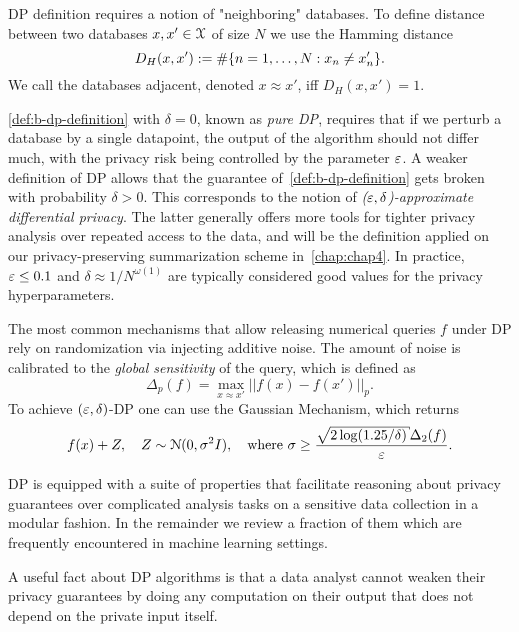 DP definition requires a notion of "neighboring" databases.
To define distance between two databases $x, x' \in \mathcal{X}$ of size $ N $ we use the Hamming distance
\[
D_{H}(x, x') := \#\{n=1,\ldots,N: x_n \neq x'_n \}.
\]
We call the databases adjacent, denoted $ x \approx x'$, iff $D_{H}(x, x')=1$.


\label{sec:b-differential-privacy}

\cref{def:b-dp-definition} with $\delta=0$, known as \emph{pure DP}, requires that if we perturb a database by a single datapoint, the output of the algorithm should not differ much, with the privacy risk being controlled by the parameter $\varepsilon$.
A weaker definition of DP allows that the guarantee of~\cref{def:b-dp-definition} gets broken with probability $\delta>0$. This corresponds to the notion of \emph{($\varepsilon, \delta$)-approximate differential privacy}. The latter generally offers more tools for tighter privacy analysis over repeated access to the data, and will be the definition applied on our privacy-preserving summarization scheme in~\cref{chap:chap4}. In practice, $\varepsilon \leq 0.1$ and $\delta \approx 1/N^{\omega(1)}$ are typically considered good values for the privacy hyperparameters. 

The most common mechanisms that allow releasing numerical queries $f$ under DP rely on randomization via injecting additive noise. The amount of noise is calibrated to the \emph{global sensitivity} of the query, which is defined as 
\[
\Delta_p(f) = \underset{x \approx x'}{\max} ||f(x)-f(x')||_p.
\]
To achieve $(\varepsilon, \delta)$-DP one can use the Gaussian Mechanism, which returns
\[
f(x)+Z, \quad Z \sim \mcN(0, \sigma^2 I), \quad \text{where } \sigma \geq \frac{\sqrt{2\log(1.25/\delta)}\Delta_2(f)}{\veps}.
\]

DP is equipped with a suite of properties that facilitate reasoning about privacy guarantees over complicated analysis tasks on a sensitive data collection in a modular fashion. In the remainder we review a fraction of them which are frequently encountered in machine learning settings.

A useful fact about DP algorithms is that a data analyst cannot weaken their privacy guarantees by doing any computation on their output that does not depend on the private input itself.

